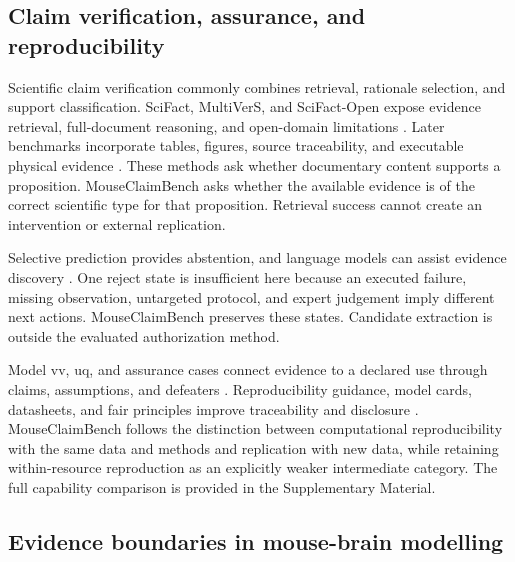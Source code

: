 \subsection{Claim verification, assurance, and reproducibility}
\label{subsec:claims-assurance}

Scientific claim verification commonly combines retrieval, rationale selection, and support classification. SciFact, MultiVerS, and SciFact-Open expose evidence retrieval, full-document reasoning, and open-domain limitations \citep{wadden2020scifact,wadden2022multivers,wadden2022scifactopen}. Later benchmarks incorporate tables, figures, source traceability, and executable physical evidence \citep{vladika2023survey,lu2023scitab,wang2025sciver,tan2026scitrue,chen2026phyver,zhang2026mever}. These methods ask whether documentary content supports a proposition. MouseClaimBench asks whether the available evidence is of the correct scientific type for that proposition. Retrieval success cannot create an intervention or external replication.

Selective prediction provides abstention, and language models can assist evidence discovery \citep{geifman2019selectivenet,fadeeva2024factchecking}. One reject state is insufficient here because an executed failure, missing observation, untargeted protocol, and expert judgement imply different next actions. MouseClaimBench preserves these states. Candidate extraction is outside the evaluated authorization method.

Model \ac{vv}, \ac{uq}, and assurance cases connect evidence to a declared use through claims, assumptions, and defeaters \citep{oberkampf2010verification,sargent2013verification,riedmaier2021vvuq,asme2018vv40,batarseh2021assurance,mohamad2021assurance}. Reproducibility guidance, model cards, datasheets, and \ac{fair} principles improve traceability and disclosure \citep{nasem2019reproducibility,wilkinson2016fair,mitchell2019modelcards,gebru2021datasheets,pineau2021reproducibility,barker2022fair4rs}. MouseClaimBench follows the distinction between computational reproducibility with the same data and methods and replication with new data, while retaining within-resource reproduction as an explicitly weaker intermediate category. The full capability comparison is provided in the Supplementary Material.

\subsection{Evidence boundaries in mouse-brain modelling}
\label{subsec:neurocomputational-boundaries}

